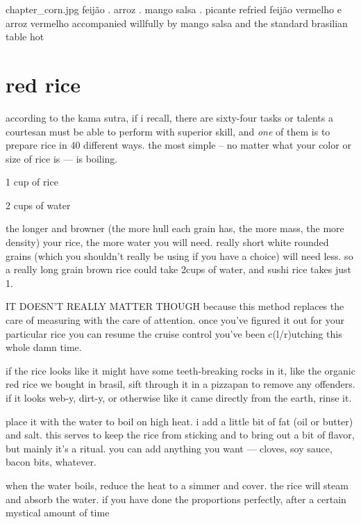 \mychapter
{chapter_corn.jpg}
{feij\~{a}o . arroz . mango salsa . picante}
{refried feij\~{a}o vermelho e arroz vermelho accompanied willfully by
mango salsa and the standard brasilian table hot}

\label{chap:feijao}

\section{red rice}

according to the kama sutra, if i recall, there are sixty-four tasks
or talents a courtesan must be able to perform with superior skill,
and \textit{one} of them is to prepare rice in 40 different ways. the
most simple -- no matter what your color or size of rice is --- is
boiling.

\begin{ingredients}
  \item 1 cup of rice
  \item 2 cups of water
\end{ingredients}

the longer and browner (the more hull each grain has, the more mass,
the more density) your rice, the more water you will need. really
short white rounded grains (which you shouldn't really be using if you
have a choice) will need less. so a really long grain brown rice could
take 2\onehalf cups of water, and sushi rice takes just 1\onehalf.

IT DOESN'T REALLY MATTER THOUGH because this method replaces the care
of measuring with the care of attention. once you've figured it out
for your particular rice you can resume the cruise control you've been
c(l/r)utching this whole damn time.

if the rice looks like it might have some teeth-breaking rocks in it,
like the organic red rice we bought in brasil, sift through it in a
pizzapan to remove any offenders. if it looks web-y, dirt-y, or
otherwise like it came directly from the earth, rinse it.

place it with the water to boil on high heat. i add a little bit of
fat (oil or butter) and salt. this serves to keep the rice from
sticking and to bring out a bit of flavor, but mainly it's a
ritual. you can add anything you want --- cloves, soy sauce, bacon
bits, whatever.

when the water boils, reduce the heat to a simmer and cover. the rice
will steam and absorb the water. if you have done the proportions
perfectly, after a certain mystical amount of time

